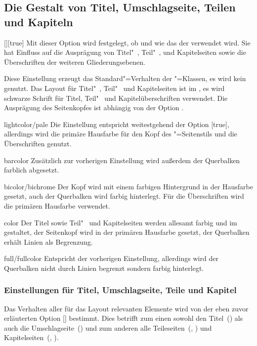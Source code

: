 \begin{Declaration*}{}
\begin{Declaration*}{}
\begin{Declaration*}{}
\subsection{Die Gestalt von Titel, Umschlagseite, Teilen und Kapiteln}
%
%
%
%
\begin{Declaration}{[\PSet]}[true]
\printdeclarationlist%
%
Mit dieser Option wird festgelegt, ob und wie das \CD der \TnUD verwendet wird. 
Sie hat Einfluss auf die Ausprägung von Titel"~, Teil"~, und Kapitelseiten 
sowie die Überschriften der weiteren Gliederungsebenen.
%
\begin{values}
\itemfalse
  Diese Einstellung erzeugt das Standard"=Verhalten der \KOMAScript"=Klassen, 
  es wird kein \CD genutzt.
  Das Layout für Titel"~, Teil"~ und Kapitelseiten ist im \CD, es wird 
  schwarze Schrift für Titel, Teil"~ und Kapitelüberschriften verwendet. Die 
  Ausprägung des Seitenkopfes ist abhängig von der Option .
\item[lightcolor/pale]
  Die Einstellung entspricht weitestgehend der Option [true], 
  allerdings wird die primäre Hausfarbe  für den Kopf des 
  "=Seitenstils und die Überschriften genutzt.
\item[barcolor]
   Zusätzlich zur vorherigen Einstellung wird außerdem der 
  Querbalken farblich abgesetzt.
\item[bicolor/bichrome]
   Der Kopf wird mit einem farbigen Hintergrund in der 
  Hausfarbe gesetzt, auch der Querbalken wird farbig hinterlegt. Für die 
  Überschriften wird die primären Hausfarbe verwendet.
\item[color]
  Der Titel sowie Teil"~ und Kapitelseiten werden allesamt farbig und im \CD 
  gestaltet, der Seitenkopf wird in der primären Hausfarbe  
  gesetzt, der Querbalken erhält Linien als Begrenzung.
\item[full/fullcolor]
   Entspricht der vorherigen Einstellung, allerdings wird der 
  Querbalken nicht durch Linien begrenzt sondern farbig hinterlegt.
\end{values}
\end{Declaration}


\subsubsection{Einstellungen für Titel, Umschlagseite, Teile und Kapitel}
Das Verhalten aller für das Layout relevanten Elemente wird von der eben zuvor 
erläuterten Option [\PSet] bestimmt. Dies betrifft zum einen sowohl 
den Titel~() als auch die Umschlagseite~() 
und zum anderen alle Teileseiten~(, ) und 
Kapitelseiten~(, ).


\end{Declaration*}
\end{Declaration*}
\end{Declaration*}
